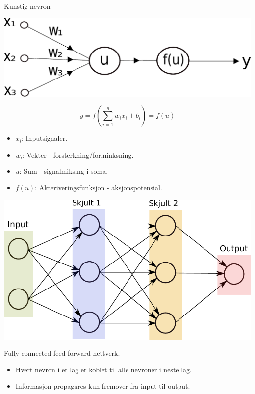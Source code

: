 \documentclass{beamer}
\begin{document}
\begin{frame}{Kunstig nevron}

\centering
\includegraphics[width=0.8\linewidth]{../Figures/Theory/neuron.pdf} 

\begin{equation*}
 y = f\left(\sum_{i=1}^n w_ix_i + b_i\right) = f(u)
\end{equation*}

\begin{itemize}
 \item $x_i$: Inputsignaler.
 \item $w_i$: Vekter - forsterkning/forminksning.  
 \item $u$: Sum - signalmiksing i soma.
 \item $f(u)$: Akteriveringsfunksjon - aksjonspotensial.
\end{itemize}

\end{frame}


\begin{frame}
 
\centering
\includegraphics[width=0.8\linewidth]{../Figures/Presentation/networkGeneral.pdf}

\begin{block}{Fully-connected feed-forward nettverk.}
 \begin{itemize}
  \item Hvert nevron i et lag er koblet til alle nevroner i neste lag. 
  \item Informasjon propagares kun fremover fra input til output.
 \end{itemize}
\end{block}

\end{frame}
\end{document}
